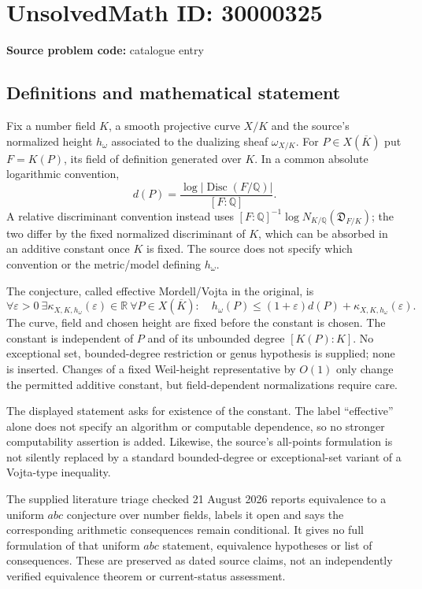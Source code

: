 \documentclass[11pt]{article}
\newcommand{\Q}{\mathbb{Q}}
\newcommand{\R}{\mathbb{R}}
\begin{document}
\section*{UnsolvedMath ID: 30000325}
\textbf{Source problem code:} catalogue entry
\subsection{Definitions and mathematical statement}
Fix a number field $K$, a smooth projective curve $X/K$ and the source's normalized height $h_\omega$ associated to the dualizing sheaf $\omega_{X/K}$. For $P\in X(\overline K)$ put $F=K(P)$, its field of definition generated over $K$. In a common absolute logarithmic convention,
\[
 d(P)=\frac{\log|\operatorname{Disc}(F/\Q)|}{[F:\Q]}.
\]
A relative discriminant convention instead uses $[F:\Q]^{-1}\log N_{K/\Q}(\mathfrak D_{F/K})$; the two differ by the fixed normalized discriminant of $K$, which can be absorbed in an additive constant once $K$ is fixed. The source does not specify which convention or the metric/model defining $h_\omega$.

The conjecture, called effective Mordell/Vojta in the original, is
\[
 \forall\varepsilon>0\ \exists\kappa_{X,K,h_\omega}(\varepsilon)\in\R\ 
 \forall P\in X(\overline K):\quad
 h_\omega(P)\leq(1+\varepsilon)d(P)
                 +\kappa_{X,K,h_\omega}(\varepsilon).
\]
The curve, field and chosen height are fixed before the constant is chosen. The constant is independent of $P$ and of its unbounded degree $[K(P):K]$. No exceptional set, bounded-degree restriction or genus hypothesis is supplied; none is inserted. Changes of a fixed Weil-height representative by $O(1)$ only change the permitted additive constant, but field-dependent normalizations require care.

The displayed statement asks for existence of the constant. The label ``effective'' alone does not specify an algorithm or computable dependence, so no stronger computability assertion is added. Likewise, the source's all-points formulation is not silently replaced by a standard bounded-degree or exceptional-set variant of a Vojta-type inequality.

The supplied literature triage checked 21 August 2026 reports equivalence to a uniform $abc$ conjecture over number fields, labels it open and says the corresponding arithmetic consequences remain conditional. It gives no full formulation of that uniform $abc$ statement, equivalence hypotheses or list of consequences. These are preserved as dated source claims, not an independently verified equivalence theorem or current-status assessment.
\end{document}
